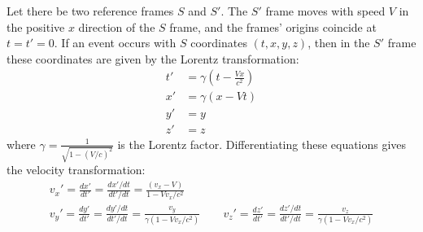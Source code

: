 \documentclass[../p023main.tex]{subfiles}
\begin{document}
\begin{summary}
    Let there be two reference frames $S$ and $S'$.
    The $S'$ frame moves with speed $V$ in the positive $x$ direction of the $S$ frame, and the frames' origins coincide at $t = t' = 0$.
    If an event occurs with $S$ coordinates $(t, x, y, z)$, then in the $S'$ frame these coordinates are given by the Lorentz transformation:
    \begin{align*}
        t' &= \gamma \left( t - \frac{Vx}{c^2} \right) \\
        x' &= \gamma \left( x - Vt \right) \\
        y' &= y \\
        z' &= z
    \end{align*}
    where $\gamma = \frac{1}{\sqrt{1 - \left( V / c \right)^2}}$ is the Lorentz factor.
    Differentiating these equations gives the velocity transformation:
    \begin{gather*}
        v_x' = \frac{dx'}{dt'} = \frac{dx'/dt}{dt'/dt} = \frac{(v_x - V)}{1 - Vv_x / c^2} \\
        v_y' = \frac{dy'}{dt'} = \frac{dy'/dt}{dt'/dt} = \frac{v_y}{\gamma \left( 1 - Vv_x / c^2 \right)} \qquad
        v_z' = \frac{dz'}{dt'} = \frac{dz'/dt}{dt'/dt} = \frac{v_z}{\gamma \left( 1 - Vv_x / c^2 \right)}
    \end{gather*}
\end{summary}
    
\end{document}
